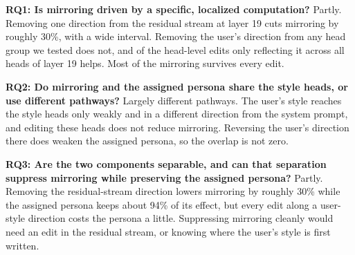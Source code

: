 \textbf{RQ1: Is mirroring driven by a specific, localized computation?} Partly. Removing one direction from the residual stream at layer 19 cuts mirroring by roughly 30\%, with a wide interval. Removing the user's direction from any head group we tested does not, and of the head-level edits only reflecting it across all heads of layer 19 helps. Most of the mirroring survives every edit.

\textbf{RQ2: Do mirroring and the assigned persona share the style heads, or use different pathways?} Largely different pathways. The user's style reaches the style heads only weakly and in a different direction from the system prompt, and editing these heads does not reduce mirroring. Reversing the user's direction there does weaken the assigned persona, so the overlap is not zero.

\textbf{RQ3: Are the two components separable, and can that separation suppress mirroring while preserving the assigned persona?} Partly. Removing the residual-stream direction lowers mirroring by roughly 30\% while the assigned persona keeps about 94\% of its effect, but every edit along a user-style direction costs the persona a little. Suppressing mirroring cleanly would need an edit in the residual stream, or knowing where the user's style is first written.
